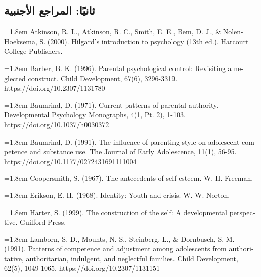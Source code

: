 \documentclass[12pt,oneside]{report}
\begin{document}
\subsection*{ثانيًا: المراجع الأجنبية}
\noindent\hangindent=1.8em \textenglish{Atkinson, R. L., Atkinson, R. C., Smith, E. E., Bem, D. J., \& Nolen-Hoeksema, S. (2000). Hilgard's introduction to psychology (13th ed.). Harcourt College Publishers.}\par\vspace{3pt}
\noindent\hangindent=1.8em \textenglish{Barber, B. K. (1996). Parental psychological control: Revisiting a neglected construct. Child Development, 67(6), 3296-3319. https://doi.org/\textenglish{10.2307}/1131780}\par\vspace{3pt}
\noindent\hangindent=1.8em \textenglish{Baumrind, D. (1971). Current patterns of parental authority. Developmental Psychology Monographs, 4(1, Pt. 2), 1-103. https://doi.org/\textenglish{10.1037}/h0030372}\par\vspace{3pt}
\noindent\hangindent=1.8em \textenglish{Baumrind, D. (1991). The influence of parenting style on adolescent competence and substance use. The Journal of Early Adolescence, 11(1), 56-95. https://doi.org/\textenglish{10.1177}/0272431691111004}\par\vspace{3pt}
\noindent\hangindent=1.8em \textenglish{Coopersmith, S. (1967). The antecedents of self-esteem. W. H. Freeman.}\par\vspace{3pt}
\noindent\hangindent=1.8em \textenglish{Erikson, E. H. (1968). Identity: Youth and crisis. W. W. Norton.}\par\vspace{3pt}
\noindent\hangindent=1.8em \textenglish{Harter, S. (1999). The construction of the self: A developmental perspective. Guilford Press.}\par\vspace{3pt}
\noindent\hangindent=1.8em \textenglish{Lamborn, S. D., Mounts, N. S., Steinberg, L., \& Dornbusch, S. M. (1991). Patterns of competence and adjustment among adolescents from authoritative, authoritarian, indulgent, and neglectful families. Child Development, 62(5), 1049-1065. https://doi.org/\textenglish{10.2307}/1131151}\par\vspace{3pt}
\end{document}
